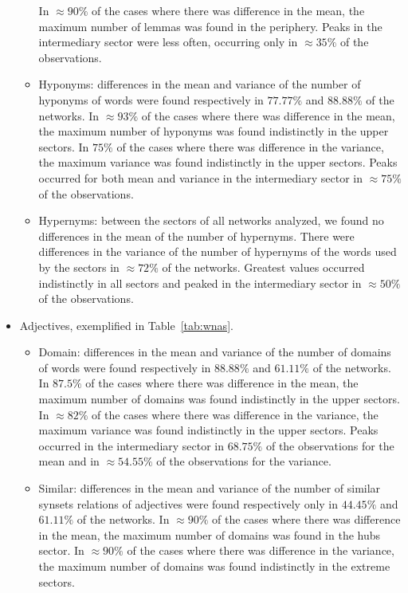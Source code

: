 \documentclass[review]{elsarticle}
\begin{document}
\begin{itemize}
\begin{itemize}
In $\approx 90\%$ of the cases where there was difference in the mean, the maximum number of lemmas was found in the periphery.
Peaks in the intermediary sector were less often, occurring only in $\approx 35\%$ of the observations.
\item Hyponyms:
differences in the mean and variance of the number of hyponyms of words were found respectively in $77.77\%$ and $88.88\%$ of the networks.
In $\approx 93\%$ of the cases where there was difference in the mean, 
the maximum number of hyponyms was found indistinctly in the upper sectors.
In $75\%$ of the cases where there was difference in the variance, 
the maximum variance was found indistinctly in the upper sectors.
Peaks occurred for both mean and variance in the intermediary sector in $\approx 75\%$ of the observations.
\item Hypernyms:
between the sectors of all networks analyzed, we found no differences in the mean of the number of hypernyms.
There were differences in the variance of the number of hypernyms of the words used by the sectors in $\approx 72\%$ of the networks.
Greatest values occurred indistinctly in all sectors and peaked in the intermediary sector in $\approx 50\%$ of the observations.

\FloatBarrier
\end{itemize}
\item Adjectives, exemplified in Table~\ref{tab:wnas}.
\begin{itemize}
\item Domain:
differences in the mean and variance of the number of domains of words were found respectively in $88.88\%$ and $61.11\%$ of the networks.
In $87.5\%$ of the cases where there was difference in the mean, 
the maximum number of domains was found indistinctly in the upper sectors.
In $\approx 82\%$ of the cases where there was difference in the variance, 
the maximum variance was found indistinctly in the upper sectors.
Peaks occurred in the intermediary sector in $68.75\%$ of the observations for the mean
and in $\approx 54.55\%$ of the observations for the variance.
\item Similar:
differences in the mean and variance of the number of similar synsets relations of adjectives were found respectively only in $44.45\%$ and $61.11\%$ of the networks.
In $\approx 90\%$ of the cases where there was difference in the mean, 
the maximum number of domains was found in the hubs sector.
In $\approx 90\%$ of the cases where there was difference in the variance, 
the maximum number of domains was found indistinctly in the extreme sectors.

\end{itemize}
\end{itemize}
\end{document}
